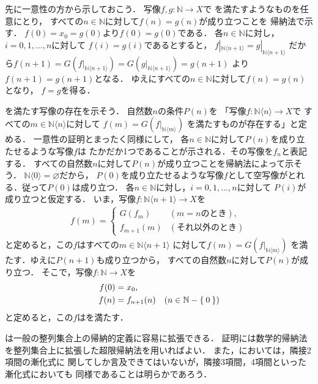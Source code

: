 \documentclass[11pt,a4paper]{ltjsarticle} %
\makeatletter
\theoremstyle{mystyle} %
\renewenvironment{proof}[1][\proofname]{\par
  \pushQED{\qed}%
  \normalfont \topsep6\p@\@plus6\p@\relax
  \trivlist
\item[\hskip\labelsep
  \itshape
  #1]\ignorespaces%
  }{%
  \popQED\endtrivlist\@endpefalse
}
\renewcommand{\proofname}{\textbf{［証明］}}
\makeatother
\begin{document}
\begin{proof}
  先に一意性の方から示しておこう．
  写像$f,g \colon \mathbb{N} \longrightarrow X$で
  を満たすようなものを任意にとり，
  すべての$n \in \mathbb{N}$に対して$f(n) = g(n)$が成り立つことを
  帰納法で示す．
  $f(0) = x_0 = g(0)$より$f(0)=g(0)$である．
  各$n \in \mathbb{N}$に対し，$i= 0,1, \ldots, n$に対して
  $f(i)=g(i)$であるとすると，
  $f|_{\mathbb{N} \langle n+1 \rangle} = g|_{\mathbb{N} \langle n+1 \rangle} $
  だから$f(n+1) = G \left( f|_{\mathbb{N} \langle n+1 \rangle} \right) =
  G \left ( g |_{\mathbb{N} \langle n+1 \rangle} \right) = g(n+1)$
  より$f(n+1) =g(n+1)$となる．
  ゆえにすべての$n \in \mathbb{N}$に対して$f(n) = g(n)$となり，
  $f=g$を得る．

  を満たす写像の存在を示そう．
  自然数$n$の条件$P(n)$を
  「写像$f \colon \mathbb{N} \langle n \rangle \longrightarrow X$で
  すべての$m \in \mathbb{N} \langle n \rangle$に対して
  $f(m) = G \left( f|_{\mathbb{N} \langle m \rangle } \right)$
  を満たすものが存在する」と定める．
  一意性の証明とまったく同様にして，
  各$n \in \mathbb{N}$に対して$P(n)$を成り立たせるような写像$f$は
  たかだか1つであることが示される．その写像を$f_n$と表記する．
  すべての自然数$n$に対して$P(n)$が成り立つことを帰納法によって示そう．
  $\mathbb{N} \langle 0 \rangle = \varnothing$だから，
  $P(0)$を成り立たせるような写像$f$として空写像がとれる．従って$P(0)$は成り立つ．
  各$n \in \mathbb{N}$に対し，$i=0,1,\ldots,n$に対して
  $P(i)$が成り立つと仮定する．
  いま，写像$f \colon \mathbb{N} \langle n+1 \rangle \longrightarrow X$を
  \begin{align*}
    f (m) = 
    \begin{cases}
      G \left( f_{m} \right) & ( \text{$m=n$のとき} ) , \\
      f_{m+1} (m) & (\text{それ以外のとき})
    \end{cases}
  \end{align*}
  と定めると，この$f$はすべての$m \in \mathbb{N} \langle n+1 \rangle$
  に対して$f(m) = G \left( f|_{\mathbb{N} \langle m \rangle} \right)$
  を満たす．ゆえに$P(n+1)$も成り立つから，
  すべての自然数$n$に対して$P(n)$が成り立つ．
  そこで，写像$f \colon \mathbb{N} \longrightarrow X$を
  \begin{align*}
    f(0) & = x_0 , \\ 
    f(n) & = f_{n+1} (n) \quad ( n \in \mathbb{N} - \Set{0})
  \end{align*}
  と定めると，この$f$はを満たす．
\end{proof}


は一般の整列集合上の帰納的定義に容易に拡張できる．
証明には数学的帰納法を整列集合上に拡張した超限帰納法を用いればよい．
また，においては，隣接2項間の漸化式に
関してしか言及できてはいないが，隣接3項間，4項間といった漸化式においても
同様であることは明らかであろう．

%
\printbibliography[title=参考文献]
\end{document}
